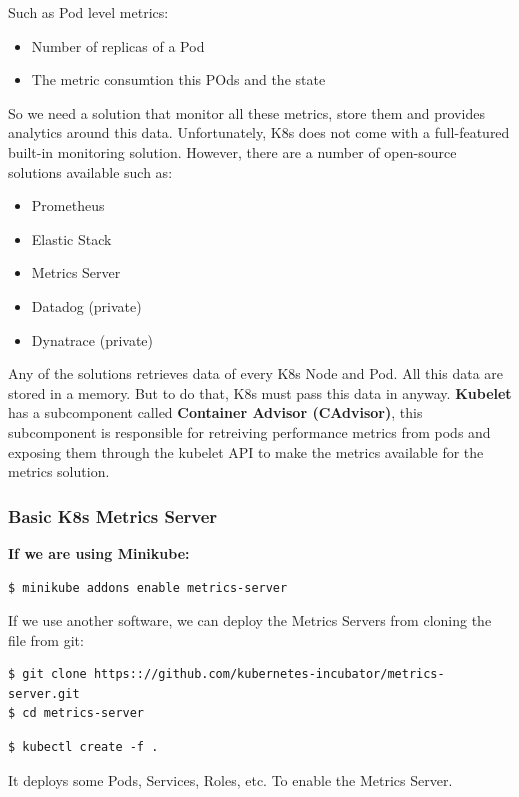 \documentclass{article}
\newenvironment{codetemplate}[1][]{%
  \mybasecolorbox[#1]
  \itshape
}{%
  \endmybasecolorbox
}
\begin{document}
Such as Pod level metrics:
\begin{itemize}
    \item Number of replicas of a Pod
    \item The metric consumtion this POds and the state
\end{itemize}

So we need a solution that monitor all these metrics, store them and provides analytics around this data. Unfortunately, K8s does not come with a full-featured built-in monitoring solution. However, there are a number of open-source solutions available such as:
\begin{itemize}
    \item Prometheus
    \item Elastic Stack
    \item Metrics Server
    \item Datadog (private)
    \item Dynatrace (private)
\end{itemize}

Any of the solutions retrieves data of every K8s Node and Pod. All this data are stored in a memory. But to do that, K8s must pass this data in anyway. \textbf{Kubelet} has a subcomponent called \textbf{Container Advisor (CAdvisor)}, this subcomponent is responsible for retreiving performance metrics from pods and exposing them through the kubelet API to make the metrics available for the metrics solution.

\subsubsection{Basic K8s Metrics Server}

\textbf{If we are using Minikube:}
\begin{codetemplate}{}
\begin{verbatim}
$ minikube addons enable metrics-server
\end{verbatim}
\end{codetemplate}  

If we use another software, we can deploy the Metrics Servers from cloning the file from git:
\begin{codetemplate}{}
\begin{verbatim}
$ git clone https:://github.com/kubernetes-incubator/metrics-server.git
$ cd metrics-server
\end{verbatim}
\end{codetemplate} 
\begin{codetemplate}{}
\begin{verbatim}
$ kubectl create -f .
\end{verbatim}
\end{codetemplate} 
It deploys some Pods, Services, Roles, etc. To enable the Metrics Server.
\end{document}
